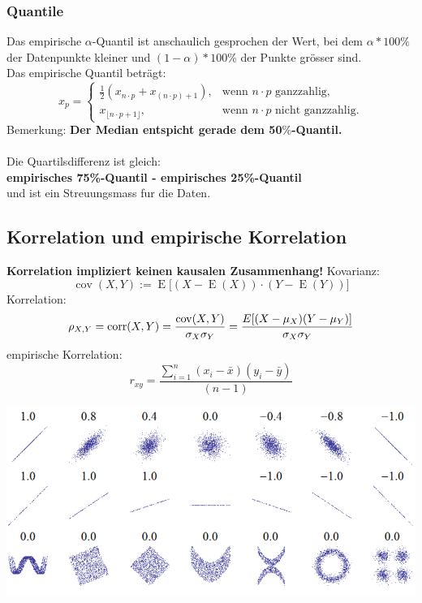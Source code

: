 \documentclass{article}
\begin{document}
\begin{multicols*}{3}
  \subsubsection{Quantile}
  Das empirische $\alpha$-Quantil ist anschaulich gesprochen der Wert, bei dem $\alpha *
  100 \%$ der Datenpunkte kleiner und $(1 - \alpha) * 100\%$ der Punkte grösser sind.
  \\Das empirische Quantil beträgt:
  $${\displaystyle x_{p}={\begin{cases}{\tfrac {1}{2}}(x_{n\cdot p}+x_{(n\cdot p)+1}),&{\text{wenn }}n\cdot p{\text{ ganzzahlig,}}\\x_{\lfloor n\cdot p+1\rfloor },&{\text{wenn }}n\cdot p{\text{ nicht ganzzahlig.}}\end{cases}}}$$
  Bemerkung: \textbf{Der Median entspicht gerade dem 50$\%$-Quantil.}
  \\\\ Die Quartilsdifferenz ist gleich:
  \\ \textbf{empirisches 75\%-Quantil - empirisches 25\%-Quantil}
  \\ und ist ein Streuungsmass fur die Daten.

  \subsection{Korrelation und empirische Korrelation}
  \textbf{Korrelation impliziert keinen kausalen Zusammenhang!}
  Kovarianz:
  $$\operatorname {cov}(X,Y):=\operatorname E{\bigl [}(X-\operatorname E(X))\cdot (Y-\operatorname E(Y)){\bigr ]}$$
  Korrelation:
  $$\rho _{X,Y}=\mathrm {corr} (X,Y)={\mathrm {cov} (X,Y) \over \sigma _{X}\sigma _{Y}}={E[(X-\mu _{X})(Y-\mu _{Y})] \over \sigma _{X}\sigma _{Y}}$$
  empirische Korrelation:
  $$r_{xy}={\frac {\sum \limits _{i=1}^{n}(x_{i}-{\bar {x}})(y_{i}-{\bar {y}})}{(n-1)}} $$

  \includegraphics[scale=0.28, angle=0]{korr}


\end{multicols*}
\end{document}
